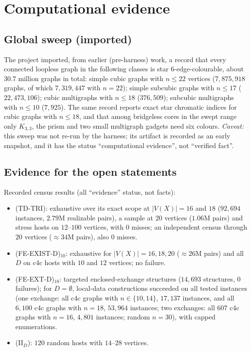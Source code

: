 \documentclass[11pt]{amsart}
\theoremstyle{definition}
\theoremstyle{remark}
\newcommand{\hyp}[1]{\textup{(#1)}}
\begin{document}
\section{Computational evidence}\label{sec:evidence}

\subsection{Global sweep (imported)}
The project imported, from earlier (pre-harness) work, a record that every connected loopless graph in the following classes is star $6$-edge-colourable, about $30.7$ million graphs in total: simple cubic graphs with $n\le 22$ vertices ($7{,}875{,}918$ graphs, of which $7{,}319{,}447$ with $n=22$); simple subcubic graphs with $n\le 17$ ($22{,}473{,}106$); cubic multigraphs with $n\le 18$ ($376{,}509$); subcubic multigraphs with $n\le 10$ ($7{,}925$). The same record reports exact star chromatic indices for cubic graphs with $n\le 18$, and that among bridgeless cores in the swept range only $K_{3,3}$, the prism and two small multigraph gadgets need six colours.
\emph{Caveat:} this sweep was not re-run by the harness; its artifact is recorded as an early snapshot, and it has the status ``computational evidence'', not ``verified fact''.

\subsection{Evidence for the open statements}
Recorded census results (all ``evidence'' status, not facts):
\begin{itemize}
\item \hyp{TD-TRI}: exhaustive over its exact scope at $|V(X)|=16$ and $18$ ($92{,}694$ instances, $2.79$M realizable pairs), a sample at $20$ vertices ($1.06$M pairs) and stress hosts on $12$--$100$ vertices, with $0$ misses; an independent census through $20$ vertices ($\approx 34$M pairs), also $0$ misses.
\item \hyp{FE-EXIST-D}$_{10}$: exhaustive for $|V(X)|=16,18,20$ ($\approx 26$M pairs) and all $D$ on c4c hosts with $10$ and $12$ vertices; no failure.
\item \hyp{FE-EXT-D}$_{10}$: targeted enclosed-exchange structures ($14{,}693$ structures, $0$ failures); for $D=\emptyset$, local-data constructions succeeded on all tested instances (one exchange: all c4c graphs with $n\in\{10,14\}$, $17{,}137$ instances, and all $6{,}100$ c4c graphs with $n=18$, $53{,}964$ instances; two exchanges: all $607$ c4c graphs with $n=16$, $4{,}801$ instances; random $n=30$), with capped enumerations.
\item \hyp{II$_D$}: $120$ random hosts with $14$--$28$ vertices.
\end{itemize}
\end{document}
